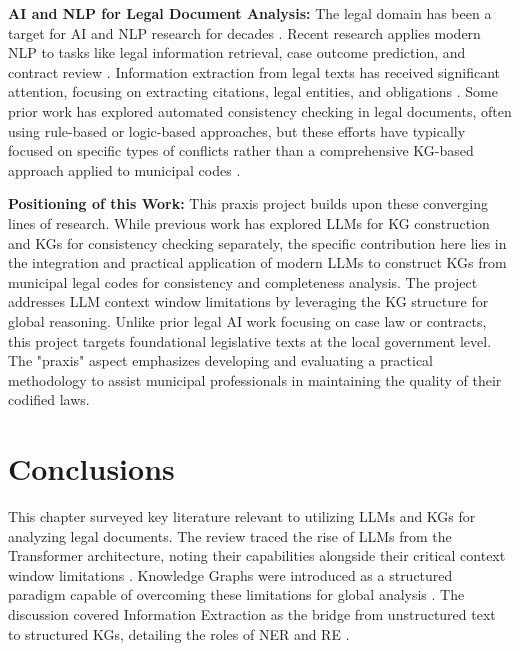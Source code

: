 \textbf{AI and NLP for Legal Document Analysis:}
The legal domain has been a target for AI and NLP research for decades \parencite{RefWorks:RefID:159-ashley2017artificial}. Recent research applies modern NLP to tasks like legal information retrieval, case outcome prediction, and contract review \parencite{RefWorks:RefID:45-moens2001innovative, RefWorks:RefID:164-aletras2016predicting, RefWorks:RefID:64-2022lexglue}. Information extraction from legal texts has received significant attention, focusing on extracting citations, legal entities, and obligations \parencite{RefWorks:RefID:125-kalamkar2022named, RefWorks:RefID:77-tauqeer2022automated}. Some prior work has explored automated consistency checking in legal documents, often using rule-based or logic-based approaches, but these efforts have typically focused on specific types of conflicts rather than a comprehensive KG-based approach applied to municipal codes \parencite{RefWorks:RefID:54-rossi2016inconsistent}.

\textbf{Positioning of this Work:}
This praxis project builds upon these converging lines of research. While previous work has explored LLMs for KG construction and KGs for consistency checking separately, the specific contribution here lies in the integration and practical application of modern LLMs to construct KGs from municipal legal codes for consistency and completeness analysis. The project addresses LLM context window limitations by leveraging the KG structure for global reasoning. Unlike prior legal AI work focusing on case law or contracts, this project targets foundational legislative texts at the local government level. The "praxis" aspect emphasizes developing and evaluating a practical methodology to assist municipal professionals in maintaining the quality of their codified laws.

\section{Conclusions}
This chapter surveyed key literature relevant to utilizing LLMs and KGs for analyzing legal documents. The review traced the rise of LLMs from the Transformer architecture, noting their capabilities alongside their critical context window limitations \parencite{RefWorks:RefID:81-vaswani2017attention, RefWorks:RefID:99-liu2025comprehensive}. Knowledge Graphs were introduced as a structured paradigm capable of overcoming these limitations for global analysis \parencite{RefWorks:RefID:102-hogan2021knowledge}. The discussion covered Information Extraction as the bridge from unstructured text to structured KGs, detailing the roles of NER and RE \parencite{RefWorks:RefID:160-xu2024large}.

